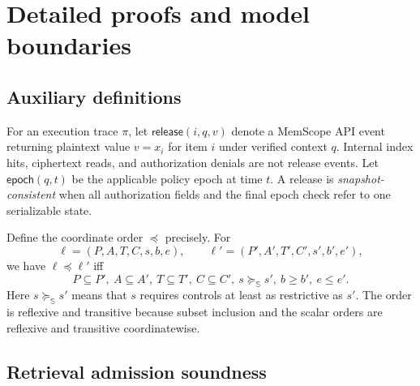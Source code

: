 \section{Detailed proofs and model boundaries}
\label{app:proofs}

\subsection{Auxiliary definitions}

For an execution trace $\pi$, let $\mathsf{release}(i,q,v)$ denote a MemScope API event returning plaintext value $v=x_i$ for item $i$ under verified context $q$. Internal index hits, ciphertext reads, and authorization denials are not release events. Let $\mathsf{epoch}(q,t)$ be the applicable policy epoch at time $t$. A release is \emph{snapshot-consistent} when all authorization fields and the final epoch check refer to one serializable state.

Define the coordinate order $\preceq$ precisely. For
\[
\ell=(P,A,T,C,s,b,e),\qquad \ell'=(P',A',T',C',s',b',e'),
\]
we have $\ell\preceq\ell'$ iff
\[
P\subseteq P',\ A\subseteq A',\ T\subseteq T',\ C\subseteq C',\ s\succeq_{\mathbb S}s',\ b\ge b',\ e\le e'.
\]
Here $s\succeq_{\mathbb S}s'$ means that $s$ requires controls at least as restrictive as $s'$. The order is reflexive and transitive because subset inclusion and the scalar orders are reflexive and transitive coordinatewise.

\subsection{Retrieval admission soundness}
\label{app:proof-admission}

